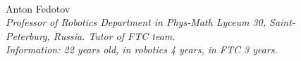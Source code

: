 \begin{figure}[H]
	\begin{minipage}[h]{0.47\linewidth}
		\\
	\end{minipage}
	\hfill
	\begin{minipage}{0.47\linewidth}
		Anton Fedotov \\ 
		\emph{Professor of Robotics Department in Phys-Math Lyceum 30, Saint-Peterburg, Russia. Tutor of FTC team. \\}
		\emph{Information: 22 years old, in robotics 4 years, in FTC 3 years.}
	\end{minipage}	
	\vfill 
\end{figure}

